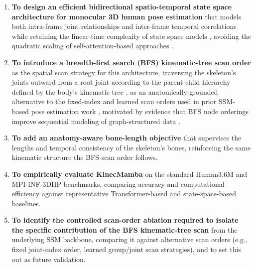 \begin{enumerate}
  \item \textbf{To design an efficient bidirectional spatio-temporal state
    space architecture for monocular 3D human pose estimation} that models
    both intra-frame joint relationships and inter-frame temporal
    correlations while retaining the linear-time complexity of state space
    models \cite{gu2023mamba, gu2021s4}, avoiding the quadratic scaling of
    self-attention-based approaches \cite{zheng2021poseformer,
    zhang2022mixste, zhu2023motionbert}.

  \item \textbf{To introduce a breadth-first search (BFS) kinematic-tree
    scan order} as the spatial scan strategy for this architecture,
    traversing the skeleton's joints outward from a root joint according
    to the parent-child hierarchy defined by the body's kinematic tree
    \cite{loper2015smpl}, as an anatomically-grounded alternative to the
    fixed-index and learned scan orders used in prior SSM-based pose
    estimation work \cite{nguyen2025skeletonmamba}, motivated by evidence
    that BFS node orderings improve sequential modeling of graph-structured
    data \cite{you2018graphrnn}.

  \item \textbf{To add an anatomy-aware bone-length objective} that
    supervises the lengths and temporal consistency of the skeleton's bones,
    reinforcing the same kinematic structure the BFS scan order follows.

  \item \textbf{To empirically evaluate KinecMamba} on the standard
    Human3.6M \cite{ionescu2014human36m} and MPI-INF-3DHP
    \cite{mehta2017mpiinf3dhp} benchmarks, comparing accuracy and
    computational efficiency against representative Transformer-based
    \cite{zhang2022mixste, zhu2023motionbert, mehraban2024motionagformer}
    and state-space-based \cite{zhang2024posemagic, huang2025posemamba,
    cui2025sasmamba, wang2025dbmambapose} baselines.

  \item \textbf{To identify the controlled scan-order ablation required to
    isolate the specific contribution of the BFS kinematic-tree scan} from
    the underlying SSM backbone, comparing it against alternative scan orders
    (e.g., fixed joint-index order, learned group/joint scan strategies), and
    to set this out as future validation.
\end{enumerate}

